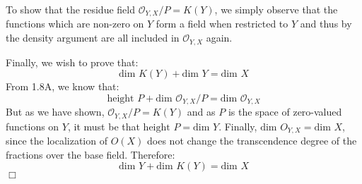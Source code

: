 \documentclass{article}
\begin{document}
To show that the residue field $\mathcal{O}_{Y,X} / P = K(Y)$, we simply observe that the functions which are non-zero on $Y$ form a field when restricted to $Y$ and thus by the density argument are all included in $\mathcal{O}_{Y,X}$ again.

Finally, we wish to prove that:
\[ \textrm{dim } K(Y) + \textrm{dim } Y = \textrm{dim } X \]
From 1.8A, we know that:
\[ \textrm{height } P + \textrm{dim }\mathcal{O}_{Y,X}/P = \textrm{dim }\mathcal{O}_{Y,X} \]
But as we have shown, $\mathcal{O}_{Y,X}/P = K(Y)$ and as $P$ is the space of zero-valued functions on $Y$, it must be that $\textrm{height } P = \textrm{dim } Y$.  Finally, $\textrm{dim }O_{Y,X} = \textrm{dim } X$, since the localization of $O(X)$ does not change the transcendence degree of the fractions over the base field.  Therefore:
\[ \textrm{dim } Y + \textrm{dim } K(Y) = \textrm{dim } X \]
$\Box$
\end{document}
